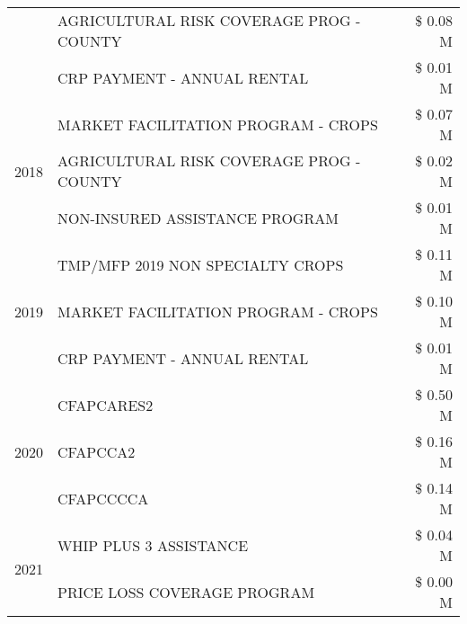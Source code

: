 \begin{tabular}{llr}
 & AGRICULTURAL RISK COVERAGE PROG - COUNTY & \$ 0.08 M \\
 & CRP PAYMENT - ANNUAL RENTAL & \$ 0.01 M \\
\cline{1-3}
\multirow[t]{3}{*}{2018} & MARKET FACILITATION PROGRAM - CROPS & \$ 0.07 M \\
 & AGRICULTURAL RISK COVERAGE PROG - COUNTY & \$ 0.02 M \\
 & NON-INSURED ASSISTANCE PROGRAM & \$ 0.01 M \\
\cline{1-3}
\multirow[t]{3}{*}{2019} & TMP/MFP 2019 NON SPECIALTY CROPS & \$ 0.11 M \\
 & MARKET FACILITATION PROGRAM - CROPS & \$ 0.10 M \\
 & CRP PAYMENT - ANNUAL RENTAL & \$ 0.01 M \\
\cline{1-3}
\multirow[t]{3}{*}{2020} & CFAPCARES2 & \$ 0.50 M \\
 & CFAPCCA2 & \$ 0.16 M \\
 & CFAPCCCCA & \$ 0.14 M \\
\cline{1-3}
\multirow[t]{2}{*}{2021} & WHIP PLUS 3 ASSISTANCE & \$ 0.04 M \\
 & PRICE LOSS COVERAGE PROGRAM & \$ 0.00 M \\
\cline{1-3}
\bottomrule
\end{tabular}
